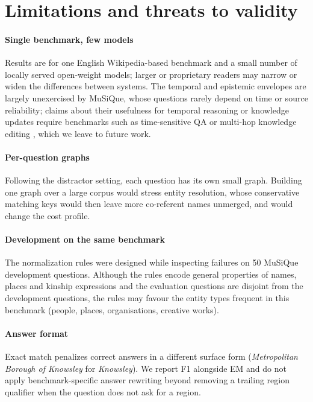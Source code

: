 \documentclass[preprint,12pt,authoryear]{elsarticle}
\begin{document}
\section{Limitations and threats to validity}
\label{sec:limitations}

\paragraph{Single benchmark, few models}
Results are for one English Wikipedia-based benchmark and a small number of locally served open-weight models; larger or proprietary readers may narrow or widen the differences between systems.
The temporal and epistemic envelopes are largely unexercised by MuSiQue, whose questions rarely depend on time or source reliability; claims about their usefulness for temporal reasoning or knowledge updates require benchmarks such as time-sensitive QA \citep{chen2021timeqa} or multi-hop knowledge editing \citep{zhong2023mquake}, which we leave to future work.

\paragraph{Per-question graphs}
Following the distractor setting, each question has its own small graph.
Building one graph over a large corpus would stress entity resolution, whose conservative matching keys would then leave more co-referent names unmerged, and would change the cost profile.

\paragraph{Development on the same benchmark}
The normalization rules were designed while inspecting failures on 50 MuSiQue development questions.
Although the rules encode general properties of names, places and kinship expressions and the evaluation questions are disjoint from the development questions, the rules may favour the entity types frequent in this benchmark (people, places, organisations, creative works).

\paragraph{Answer format}
Exact match penalizes correct answers in a different surface form (\textit{Metropolitan Borough of Knowsley} for \textit{Knowsley}).
We report F1 alongside EM and do not apply benchmark-specific answer rewriting beyond removing a trailing region qualifier when the question does not ask for a region.
\end{document}
